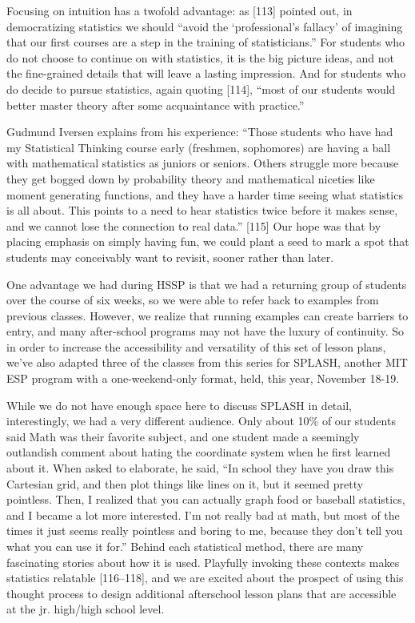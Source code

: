 \documentclass[12pt,twoside]{mitthesis-manusdown}
\begin{document}
Focusing on intuition has a twofold advantage: as {[}113{]} pointed out,
in democratizing statistics we should ``avoid the `professional's
fallacy' of imagining that our first courses are a step in the training
of statisticians.'' For students who do not choose to continue on with
statistics, it is the big picture ideas, and not the fine-grained
details that will leave a lasting impression. And for students who do
decide to pursue statistics, again quoting {[}114{]}, ``most of our
students would better master theory after some acquaintance with
practice.''

Gudmund Iversen explains from his experience: ``Those students who have
had my Statistical Thinking course early (freshmen, sophomores) are
having a ball with mathematical statistics as juniors or seniors. Others
struggle more because they get bogged down by probability theory and
mathematical niceties like moment generating functions, and they have a
harder time seeing what statistics is all about. This points to a need
to hear statistics twice before it makes sense, and we cannot lose the
connection to real data.'' {[}115{]} Our hope was that by placing
emphasis on simply having fun, we could plant a seed to mark a spot that
students may conceivably want to revisit, sooner rather than later.

One advantage we had during HSSP is that we had a returning group of
students over the course of six weeks, so we were able to refer back to
examples from previous classes. However, we realize that running
examples can create barriers to entry, and many after-school programs
may not have the luxury of continuity. So in order to increase the
accessibility and versatility of this set of lesson plans, we've also
adapted three of the classes from this series for SPLASH, another MIT
ESP program with a one-weekend-only format, held, this year, November
18-19.

While we do not have enough space here to discuss SPLASH in detail,
interestingly, we had a very different audience. Only about 10\% of our
students said Math was their favorite subject, and one student made a
seemingly outlandish comment about hating the coordinate system when he
first learned about it. When asked to elaborate, he said, ``In school
they have you draw this Cartesian grid, and then plot things like lines
on it, but it seemed pretty pointless. Then, I realized that you can
actually graph food or baseball statistics, and I became a lot more
interested. I'm not really bad at math, but most of the times it just
seems really pointless and boring to me, because they don't tell you
what you can use it for.'' Behind each statistical method, there are
many fascinating stories about how it is used. Playfully invoking these
contexts makes statistics relatable {[}116--118{]}, and we are excited
about the prospect of using this thought process to design additional
afterschool lesson plans that are accessible at the jr. high/high school
level.
\end{document}
